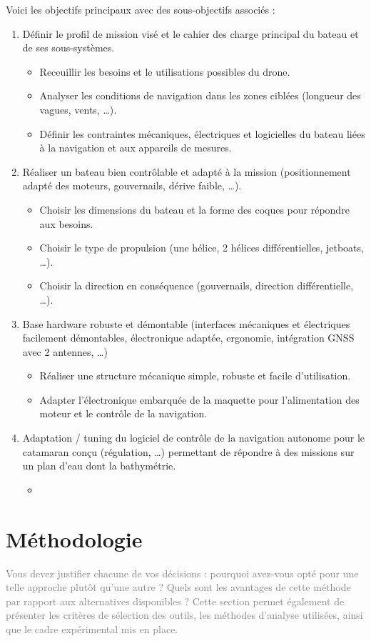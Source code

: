 Voici les objectifs principaux avec des sous-objectifs associés :
\begin{enumerate}
    \item Définir le profil de mission visé et le cahier des charge principal du bateau et de ses sous-systèmes.
    \begin{itemize}
        \item Receuillir les besoins et le utilisations possibles du drone.
        \item Analyser les conditions de navigation dans les zones ciblées (longueur des vagues, vents, \dots).
        \item Définir les contraintes mécaniques, électriques et logicielles du bateau liées à la navigation et aux appareils de mesures.
    \end{itemize}
    \item Réaliser un bateau bien contrôlable et adapté à la mission (positionnement adapté des moteurs, gouvernails, dérive faible, \dots).
    \begin{itemize}
        \item Choisir les dimensions du bateau et la forme des coques pour répondre aux besoins.
        \item Choisir le type de propulsion (une hélice, 2 hélices différentielles, jetboats, \dots).
        \item Choisir la direction en conséquence (gouvernails, direction différentielle, \dots).
    \end{itemize}
    \item Base hardware robuste et démontable (interfaces mécaniques et électriques facilement démontables, électronique adaptée, ergonomie, intégration GNSS avec 2 antennes, \dots)
    \begin{itemize}
        \item Réaliser une structure mécanique simple, robuste et facile d'utilisation.
        \item Adapter l'électronique embarquée de la maquette pour l'alimentation des moteur et le contrôle de la navigation.
    \end{itemize}
    \item Adaptation / tuning du logiciel de contrôle de la navigation autonome pour le catamaran conçu (régulation, \dots) permettant de répondre à des missions sur un plan d’eau dont la bathymétrie.
    \begin{itemize}
        \item
    \end{itemize}
\end{enumerate}

\section{Méthodologie}

\textcolor{gray}{Vous devez justifier chacune de vos décisions : pourquoi avez-vous opté pour une telle approche plutôt qu'une autre ? Quels sont les avantages de cette méthode par rapport aux alternatives disponibles ? Cette section permet également de présenter les critères de sélection des outils, les méthodes d'analyse utilisées, ainsi que le cadre expérimental mis en place.}
